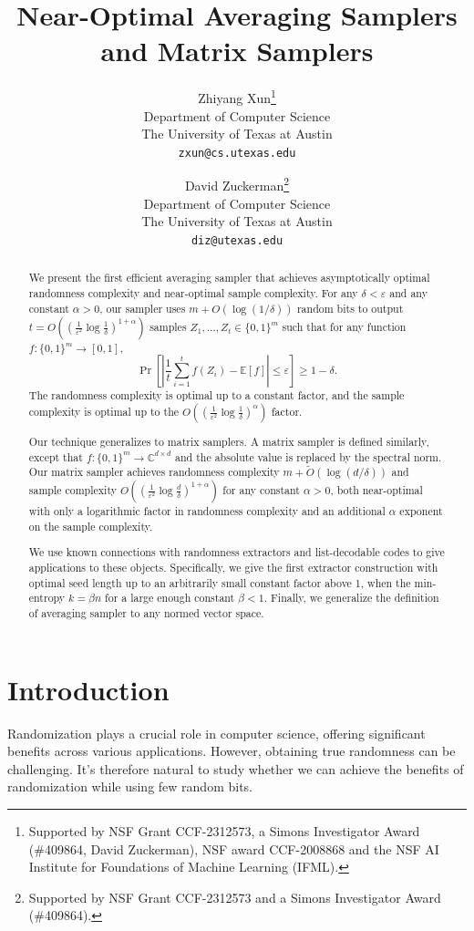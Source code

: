 \documentclass[11pt,letterpaper]{article}
\author{Zhiyang Xun\thanks{Supported by NSF Grant CCF-2312573, a Simons Investigator Award (\#409864, David Zuckerman), NSF award CCF-2008868
and the NSF AI Institute for Foundations of Machine Learning (IFML).}\\Department of Computer Science\\The University of Texas at Austin\\ \texttt{zxun@cs.utexas.edu} \and David Zuckerman\thanks{Supported by NSF Grant CCF-2312573 and a Simons Investigator Award (\#409864).}\\Department of Computer Science\\The University of Texas at Austin\\ \texttt{diz@utexas.edu}}
\title{Near-Optimal Averaging Samplers and Matrix Samplers}
\newcommand{\1}{\mathbbm{1}}
\begin{document}
\maketitle
\begin{abstract}
We present the first efficient averaging sampler that achieves asymptotically optimal randomness complexity and near-optimal sample complexity. For any $\delta < \varepsilon$ and any constant $\alpha > 0$, our sampler uses $m + O(\log (1 / \delta))$ random bits to output $t = O((\frac{1}{\varepsilon^2} \log \frac{1}{\delta})^{1 + \alpha})$ samples $Z_1, \dots, Z_t \in \{0, 1\}^m$ such that for any function $f: \{0, 1\}^m \to [0, 1]$,
\[
\Pr\left[\left|\frac{1}{t}\sum_{i=1}^t f(Z_i) - \mathbb{E}[f]\right| \leq \varepsilon\right] \geq 1 - \delta.
\]
The randomness complexity is optimal up to a constant factor, and the sample complexity is optimal up to the $O((\frac{1}{\varepsilon^2} \log \frac{1}{\delta})^{\alpha})$ factor.

Our technique generalizes to matrix samplers. A matrix sampler is defined similarly, except that $f: \{0, 1\}^m \to \mathbb{C}^{d \times d}$ and the absolute value is replaced by the spectral norm.
Our matrix sampler achieves randomness complexity $m + \widetilde O (\log(d / \delta))$ and sample complexity $ O((\frac{1}{\varepsilon^2} \log \frac{d}{\delta})^{1 + \alpha})$  for any constant $\alpha > 0$, both near-optimal with only a logarithmic factor in randomness complexity and an additional $\alpha$ exponent on the sample complexity.

We use known connections with randomness extractors and list-decodable codes to give applications to these objects. Specifically, we give the first extractor construction with optimal seed length up to an arbitrarily small constant factor above 1, when the min-entropy $k = \beta n$ for a large enough constant $\beta < 1$. Finally, we generalize the definition of averaging sampler to any normed vector space.
\end{abstract}



\section{Introduction}
Randomization plays a crucial role in computer science, offering significant benefits across various applications. However, obtaining true randomness can be challenging.
It's therefore natural to study whether we can achieve the benefits of randomization while using few random bits.
\end{document}
